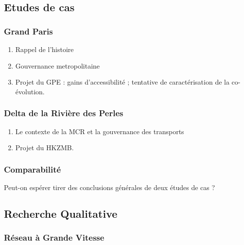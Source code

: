 \subsection{Etudes de cas}


\subsubsection{Grand Paris}

\begin{enumerate}
	\item Rappel de l'histoire
	\item Gouvernance metropolitaine
	\item Projet du GPE : gains d'accessibilité ; tentative de caractérisation de la co-évolution.
\end{enumerate}





\subsubsection{Delta de la Rivière des Perles}


\begin{enumerate}
	\item Le contexte de la MCR et la gouvernance des transports
	\item Projet du HKZMB.
\end{enumerate}

\subsubsection{Comparabilité}

Peut-on espérer tirer des conclusions générales de deux études de cas ?




\subsection{Recherche Qualitative}

\subsubsection{Réseau à Grande Vitesse}

